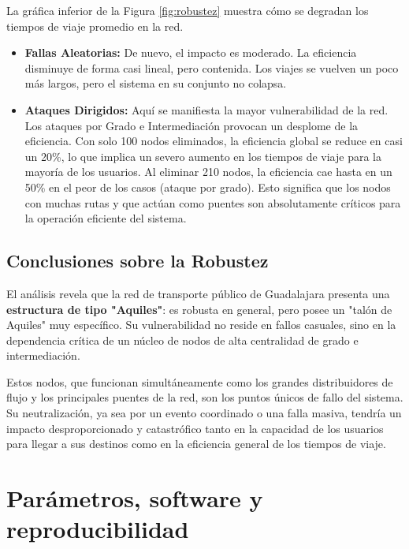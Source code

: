         La gráfica inferior de la Figura \ref{fig:robustez} muestra cómo se degradan los tiempos de viaje promedio en la red.

        \begin{itemize}
            \item \textbf{Fallas Aleatorias:} De nuevo, el impacto es moderado. La eficiencia disminuye de forma casi lineal, pero contenida. Los viajes se vuelven un poco más largos, pero el sistema en su conjunto no colapsa.
            \item \textbf{Ataques Dirigidos:} Aquí se manifiesta la mayor vulnerabilidad de la red. Los ataques por Grado e Intermediación provocan un desplome de la eficiencia. Con solo 100 nodos eliminados, la eficiencia global se reduce en casi un 20\%, lo que implica un severo aumento en los tiempos de viaje para la mayoría de los usuarios. Al eliminar 210 nodos, la eficiencia cae hasta en un 50\% en el peor de los casos (ataque por grado). Esto significa que los nodos con muchas rutas y que actúan como puentes son absolutamente críticos para la operación eficiente del sistema.
        \end{itemize}

        \subsection{Conclusiones sobre la Robustez}

        El análisis revela que la red de transporte público de Guadalajara presenta una \textbf{estructura de tipo "Aquiles"}: es robusta en general, pero posee un "talón de Aquiles" muy específico. Su vulnerabilidad no reside en fallos casuales, sino en la dependencia crítica de un núcleo de nodos de alta centralidad de grado e intermediación.

        Estos nodos, que funcionan simultáneamente como los grandes distribuidores de flujo y los principales puentes de la red, son los puntos únicos de fallo del sistema. Su neutralización, ya sea por un evento coordinado o una falla masiva, tendría un impacto desproporcionado y catastrófico tanto en la capacidad de los usuarios para llegar a sus destinos como en la eficiencia general de los tiempos de viaje.


    \section{Parámetros, software y reproducibilidad}
